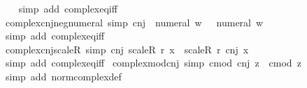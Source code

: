 \begin{isabellebody}
%
\isadelimproof
\ \ %
\endisadelimproof
%
\isatagproof
{}\isamarkupfalse%
\ {\isacharparenleft}{\kern0pt}simp\ add{\isacharcolon}{\kern0pt}\ complex{\isacharunderscore}{\kern0pt}eq{\isacharunderscore}{\kern0pt}iff{\isacharparenright}{\kern0pt}%
\endisatagproof
{\isafoldproof}%
%
\isadelimproof
\isanewline
%
\endisadelimproof
\isanewline
{}\isamarkupfalse%
\ complex{\isacharunderscore}{\kern0pt}cnj{\isacharunderscore}{\kern0pt}neg{\isacharunderscore}{\kern0pt}numeral\ {\isacharbrackleft}{\kern0pt}simp{\isacharbrackright}{\kern0pt}{\isacharcolon}{\kern0pt}\ {\isachardoublequoteopen}cnj\ {\isacharparenleft}{\kern0pt}{\isacharminus}{\kern0pt}\ numeral\ w{\isacharparenright}{\kern0pt}\ {\isacharequal}{\kern0pt}\ {\isacharminus}{\kern0pt}\ numeral\ w{\isachardoublequoteclose}\isanewline
%
\isadelimproof
\ \ %
\endisadelimproof
%
\isatagproof
{}\isamarkupfalse%
\ {\isacharparenleft}{\kern0pt}simp\ add{\isacharcolon}{\kern0pt}\ complex{\isacharunderscore}{\kern0pt}eq{\isacharunderscore}{\kern0pt}iff{\isacharparenright}{\kern0pt}%
\endisatagproof
{\isafoldproof}%
%
\isadelimproof
\isanewline
%
\endisadelimproof
\isanewline
{}\isamarkupfalse%
\ complex{\isacharunderscore}{\kern0pt}cnj{\isacharunderscore}{\kern0pt}scaleR\ {\isacharbrackleft}{\kern0pt}simp{\isacharbrackright}{\kern0pt}{\isacharcolon}{\kern0pt}\ {\isachardoublequoteopen}cnj\ {\isacharparenleft}{\kern0pt}scaleR\ r\ x{\isacharparenright}{\kern0pt}\ {\isacharequal}{\kern0pt}\ scaleR\ r\ {\isacharparenleft}{\kern0pt}cnj\ x{\isacharparenright}{\kern0pt}{\isachardoublequoteclose}\isanewline
%
\isadelimproof
\ \ %
\endisadelimproof
%
\isatagproof
{}\isamarkupfalse%
\ {\isacharparenleft}{\kern0pt}simp\ add{\isacharcolon}{\kern0pt}\ complex{\isacharunderscore}{\kern0pt}eq{\isacharunderscore}{\kern0pt}iff{\isacharparenright}{\kern0pt}%
\endisatagproof
{\isafoldproof}%
%
\isadelimproof
\isanewline
%
\endisadelimproof
\isanewline
{}\isamarkupfalse%
\ complex{\isacharunderscore}{\kern0pt}mod{\isacharunderscore}{\kern0pt}cnj\ {\isacharbrackleft}{\kern0pt}simp{\isacharbrackright}{\kern0pt}{\isacharcolon}{\kern0pt}\ {\isachardoublequoteopen}cmod\ {\isacharparenleft}{\kern0pt}cnj\ z{\isacharparenright}{\kern0pt}\ {\isacharequal}{\kern0pt}\ cmod\ z{\isachardoublequoteclose}\isanewline
%
\isadelimproof
\ \ %
\endisadelimproof
%
\isatagproof
{}\isamarkupfalse%
\ {\isacharparenleft}{\kern0pt}simp\ add{\isacharcolon}{\kern0pt}\ norm{\isacharunderscore}{\kern0pt}complex{\isacharunderscore}{\kern0pt}def{\isacharparenright}{\kern0pt}%

\end{isabellebody}
